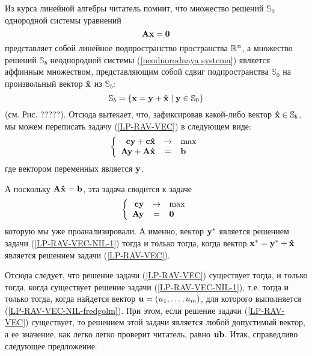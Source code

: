     Из курса линейной алгебры читатель помнит, что множество решений
    $\mathbb{S}_{0}$ однородной системы уравнений
    \[\mathbf{A}\mathbf{x}=\mathbf{0}\]
    представляет собой линейное подпространство  пространства
    ${\mathbb{R}}^{n}$, а множество решений $\mathbb{S}_{b}$
    неоднородной системы (\ref{neodnorodnaya systema})
    является аффинным множеством, представляющим собой сдвиг
    подпространства $\mathbb{S}_{0}$ на произвольный вектор
    $\mathbf{\hat{x}}$ из $\mathbb{S}_{b}$:
    \[\mathbb{S}_{b}=\{\mathbf{x}=\mathbf{y}+\mathbf{\hat{x}} \mid \mathbf{y}\in\mathbb{S}_{0}\}\]
    (см. Рис. ?????). Отсюда вытекает, что, зафиксировав какой-либо
    вектор $\mathbf{\hat{x}}\in\mathbb{S}_{b}$, мы можем переписать задачу
    (\ref{LP-RAV-VEC}) в следующем виде:
\[
    \left\{
    \begin{array}{rcl}
     \mathbf{c} \mathbf{y}+\mathbf{c} \mathbf{\hat{x}} & \to & \max  \\
    \mathbf{A} \mathbf{y}+\mathbf{A} \mathbf{\hat{x}} & = & \mathbf{b} \\
     \end{array} \right.
\]
    где вектором переменных является $\mathbf{y}$.

    А поскольку $\mathbf{A}\mathbf{\hat{x}}=\mathbf{b}$, эта задача сводится к задаче
\begin{equation} \label{LP-RAV-VEC-NIL-1}
    \left\{
    \begin{array}{rcl}
     \mathbf{c} \mathbf{y} & \to & \max  \\
    \mathbf{A} \mathbf{y} & = & \mathbf{0} \\
     \end{array} \right.
\end{equation}
    которую мы уже проанализировали. А именно, вектор $\mathbf{y^{*}}$
    является решением задачи (\ref{LP-RAV-VEC-NIL-1}) тогда и только
    тогда, когда вектор $\mathbf{x^{*}}=\mathbf{y^{*}}+\mathbf{\hat{x}}$
    является решением задачи (\ref{LP-RAV-VEC}).




    Отсюда следует, что решение задачи (\ref{LP-RAV-VEC}) существует
    тогда, и только тогда, когда существует решение задачи
    (\ref{LP-RAV-VEC-NIL-1}), т.е. тогда и только тогда, когда найдется вектор
    $\mathbf{u}=(u_{1},\ldots,u_{m})$, для которого выполняется
    (\ref{LP-RAV-VEC-NIL-fredgolm}).
     При этом, если решение задачи (\ref{LP-RAV-VEC})
    существует, то
    решением этой задачи является любой допустимый вектор, а ее
    значение, как легко легко проверит читатель, равно
    $\mathbf{u}\mathbf{b}$. Итак, справедливо следующее предложение.

